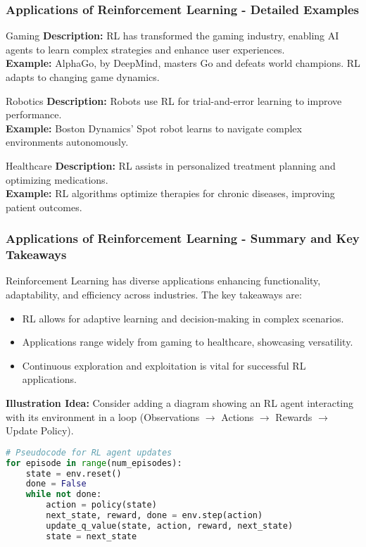 \documentclass[aspectratio=169]{beamer}
\begin{document}
\begin{frame}[fragile]
    \frametitle{Applications of Reinforcement Learning - Detailed Examples}
    \begin{block}{Gaming}
        \textbf{Description:} RL has transformed the gaming industry, enabling AI agents to learn complex strategies and enhance user experiences.\\
        \textbf{Example:} AlphaGo, by DeepMind, masters Go and defeats world champions. RL adapts to changing game dynamics.
    \end{block}
    
    \begin{block}{Robotics}
        \textbf{Description:} Robots use RL for trial-and-error learning to improve performance.\\
        \textbf{Example:} Boston Dynamics' Spot robot learns to navigate complex environments autonomously.
    \end{block}

    \begin{block}{Healthcare}
        \textbf{Description:} RL assists in personalized treatment planning and optimizing medications.\\
        \textbf{Example:} RL algorithms optimize therapies for chronic diseases, improving patient outcomes.
    \end{block}
\end{frame}

\begin{frame}[fragile]
    \frametitle{Applications of Reinforcement Learning - Summary and Key Takeaways}
    Reinforcement Learning has diverse applications enhancing functionality, adaptability, and efficiency across industries. The key takeaways are:
    \begin{itemize}
        \item RL allows for adaptive learning and decision-making in complex scenarios.
        \item Applications range widely from gaming to healthcare, showcasing versatility.
        \item Continuous exploration and exploitation is vital for successful RL applications.
    \end{itemize}
    
    \textbf{Illustration Idea:} Consider adding a diagram showing an RL agent interacting with its environment in a loop (Observations $\rightarrow$ Actions $\rightarrow$ Rewards $\rightarrow$ Update Policy).

    \begin{lstlisting}[language=Python, caption=Pseudocode for RL agent updates]
# Pseudocode for RL agent updates
for episode in range(num_episodes):
    state = env.reset()
    done = False
    while not done:
        action = policy(state)
        next_state, reward, done = env.step(action)
        update_q_value(state, action, reward, next_state)
        state = next_state
    \end{lstlisting}
\end{frame}
\end{document}
